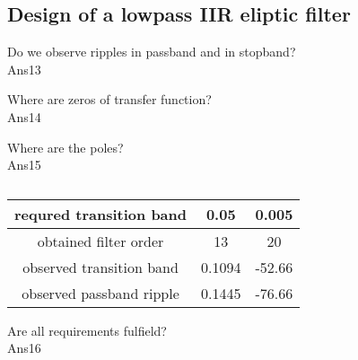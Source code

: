 \documentclass{article}
\begin{document}
\subsection*{Design of a lowpass IIR eliptic filter}

Do we observe ripples in passband and in stopband?\\
Ans13

Where are zeros of transfer function? \\
Ans14

Where are the poles? \\
Ans15

\begin{table}[h!]
  \begin{center}
    \caption{}
    \label{tab:task1tab}
    \begin{tabular}{c|c|c} 
      \textbf{requred transition band} & \textbf{0.05} & \textbf{0.005} \\
      \hline
        obtained filter order & 13 & 20 \\
        observed transition band     & 0.1094 & -52.66 \\
        observed passband ripple    & 0.1445 & -76.66 \\
    \end{tabular}
  \end{center}
\end{table}

Are all requirements fulfield? \\
Ans16
\end{document}
